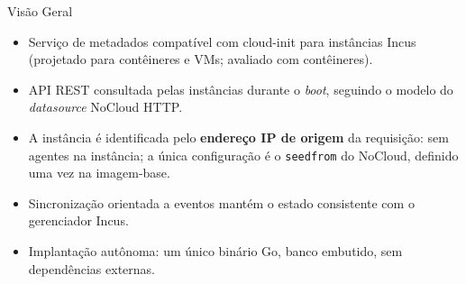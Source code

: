 \documentclass[aspectratio=169,xcolor=table]{beamer}
\begin{document}
\begin{frame}{Visão Geral}
    \begin{itemize}
        \item Serviço de metadados compatível com cloud-init para instâncias Incus
              (projetado para contêineres e VMs; avaliado com contêineres).
        \item API REST consultada pelas instâncias durante o \textit{boot}, seguindo o
              modelo do \textit{datasource} NoCloud HTTP.
        \item A instância é identificada pelo \textbf{endereço IP de origem} da
              requisição: sem agentes na instância; a única configuração é o
              \texttt{seedfrom} do NoCloud, definido uma vez na imagem-base.
        \item Sincronização orientada a eventos mantém o estado consistente com o
              gerenciador Incus.
        \item Implantação autônoma: um único binário Go, banco embutido, sem
              dependências externas.
    \end{itemize}
\end{frame}
\end{document}

